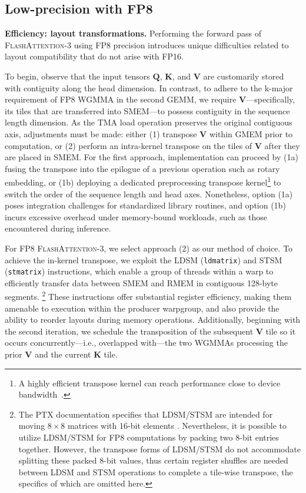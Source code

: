 \subsection{Low-precision with FP8}
\label{sec:algofp8}

\textbf{Efficiency: layout transformations.} Performing the forward pass of \textsc{FlashAttention-3} using FP8 precision introduces unique difficulties related to layout compatibility that do not arise with FP16.

To begin, observe that the input tensors $\mathbf{Q}$, $\mathbf{K}$, and $\mathbf{V}$ are customarily stored with contiguity along the head dimension. In contrast, to adhere to the k-major requirement of FP8 WGMMA in the second GEMM, we require $\mathbf{V}$—specifically, its tiles that are transferred into SMEM—to possess contiguity in the sequence length dimension. As the TMA load operation preserves the original contiguous axis, adjustments must be made: either (1) transpose $\mathbf{V}$ within GMEM prior to computation, or (2) perform an intra-kernel transpose on the tiles of $\mathbf{V}$ after they are placed in SMEM. For the first approach, implementation can proceed by (1a) fusing the transpose into the epilogue of a previous operation such as rotary embedding, or (1b) deploying a dedicated preprocessing transpose kernel\footnote{A highly efficient transpose kernel can reach performance close to device bandwidth~\citep{colfax_cutlass_transpose_2024}.} to switch the order of the sequence length and head axes. Nonetheless, option (1a) poses integration challenges for standardized library routines, and option (1b) incurs excessive overhead under memory-bound workloads, such as those encountered during inference.

For FP8 \textsc{FlashAttention-3}, we select approach (2) as our method of choice. To achieve the in-kernel transpose, we exploit the LDSM (\verb|ldmatrix|) and STSM (\verb|stmatrix|) instructions, which enable a group of threads within a warp to efficiently transfer data between SMEM and RMEM in contiguous 128-byte segments.%
\footnote{The PTX documentation specifies that LDSM/STSM are intended for moving $8 \times 8$ matrices with 16-bit elements \cite[\S 9.7.13.4.15-16]{ptx}. Nevertheless, it is possible to utilize LDSM/STSM for FP8 computations by packing two 8-bit entries together. However, the transpose forms of LDSM/STSM do not accommodate splitting these packed 8-bit values, thus certain register shuffles are needed between LDSM and STSM operations to complete a tile-wise transpose, the specifics of which are omitted here.} These instructions offer substantial register efficiency, making them amenable to execution within the producer warpgroup, and also provide the ability to reorder layouts during memory operations. Additionally, beginning with the second iteration, we schedule the transposition of the subsequent $\mathbf{V}$ tile so it occurs concurrently—i.e., overlapped with—the two WGMMAs processing the prior $\mathbf{V}$ and the current $\mathbf{K}$ tile.

